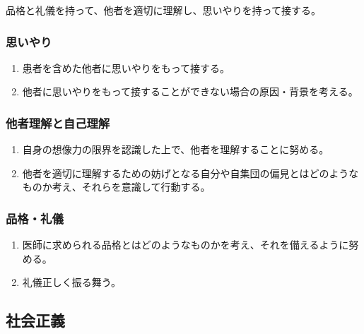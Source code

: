 品格と礼儀を持って、他者を適切に理解し、思いやりを持って接する。

\hypertarget{ux601dux3044ux3084ux308a-1}{%
\subsubsection{思いやり}\label{ux601dux3044ux3084ux308a-1}}

\begin{enumerate}
\def\labelenumi{\arabic{enumi}.}
\tightlist
\item
  患者を含めた他者に思いやりをもって接する。
\item
  他者に思いやりをもって接することができない場合の原因・背景を考える。
\end{enumerate}

\hypertarget{ux4ed6ux8005ux7406ux89e3ux3068ux81eaux5df1ux7406ux89e3}{%
\subsubsection{他者理解と自己理解}\label{ux4ed6ux8005ux7406ux89e3ux3068ux81eaux5df1ux7406ux89e3}}

\begin{enumerate}
\def\labelenumi{\arabic{enumi}.}
\tightlist
\item
  自身の想像力の限界を認識した上で、他者を理解することに努める。
\item
  他者を適切に理解するための妨げとなる自分や自集団の偏見とはどのようなものか考え、それらを意識して行動する。
\end{enumerate}

\hypertarget{ux54c1ux683cux793cux5100}{%
\subsubsection{品格・礼儀}\label{ux54c1ux683cux793cux5100}}

\begin{enumerate}
\def\labelenumi{\arabic{enumi}.}
\tightlist
\item
  医師に求められる品格とはどのようなものかを考え、それを備えるように努める。
\item
  礼儀正しく振る舞う。
\end{enumerate}

\hypertarget{ux793eux4f1aux6b63ux7fa9}{%
\subsection{社会正義}\label{ux793eux4f1aux6b63ux7fa9}}

